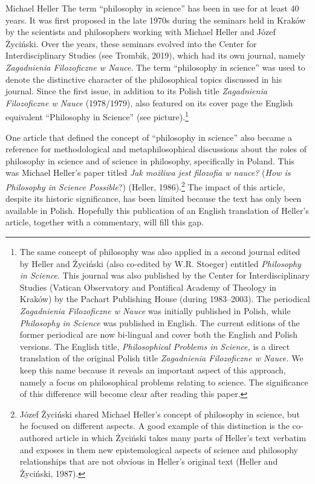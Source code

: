 \begin{artengenv}{Michael Heller}
The term “philosophy in science” has been in use for at least 40 years. It was first proposed in the late 1970s during
the seminars held in Kraków by the scientists and philosophers working with Michael Heller and Józef Życiński. Over the
years, these seminars evolved into the Center for Interdisciplinary Studies \label{ref:RNDVHajAQnl1F}(see Trombik,
2019), which had its own journal, namely \textit{Zagadnienia Filozoficzne w Nauce}. The term “philosophy in science”
was used to denote the distinctive character of the philosophical topics discussed in his journal. Since the first
issue, in addition to its Polish title \textit{Zagadnienia Filozoficzne w Nauce }(1978/1979), also featured on its
cover page the English equivalent “Philosophy in Science” (see picture).\footnote{The same concept of philosophy was
also applied in a second journal edited by Heller and Życiński (also co-edited by W.R. Stoeger) entitled
\textit{Philosophy in Science}. This journal was also published by the Center for Interdisciplinary Studies (Vatican
Observatory and Pontifical Academy of Theology in Kraków) by the Pachart Publishing House (during 1983–2003). The
periodical \textit{Zagadnienia Filozoficzne w Nauce }was initially published in Polish, while \textit{Philosophy in
Science }was published in English. The current editions of the former periodical are now bi-lingual and cover both the
English and Polish versions. The English title, \textit{Philosophical Problems in Science, }is a direct translation of
the original Polish title \textit{Zagadnienia Filozoficzne w Nauce. }We keep this name because it reveals an important
aspect of this approach, namely a focus on philosophical problems relating to science. The significance of this
difference will become clear after reading this paper.}

One article that defined the concept of “philosophy in science” also became a reference for methodological and
metaphilosophical discussions about the roles of philosophy in science and of science in philosophy, specifically in
Poland. This was Michael Heller’s paper titled \textit{Jak możliwa jest filozofia w nauce?} (\textit{How is Philosophy
in Science Possible}?) \label{ref:RNDrCU7rgcyDR}(Heller, 1986).\footnote{Józef Życiński shared Michael Heller's concept
of philosophy in science, but he focused on different aspects. A good example of this distinction is the co-authored
article in which Życiński takes many parts of Heller's text verbatim and exposes in them new epistemological aspects of
science and philosophy relationships that are not obvious in Heller’s original text \label{ref:RNDzM7nNfibOc}(Heller
and Życiński, 1987).} The impact of this article, despite its historic significance, has been limited because the text
has only been available in Polish. Hopefully this publication of an English translation of Heller’s article, together
with a commentary, will fill this gap.


\end{artengenv}
